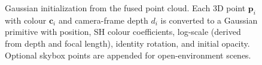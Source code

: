 \begin{figure}[t]
\caption{Gaussian initialization from the fused point cloud. Each 3D point
$\mathbf{p}_i$ with colour $\mathbf{c}_i$ and camera-frame depth $d_i$ is
converted to a Gaussian primitive with position, SH colour coefficients,
log-scale (derived from depth and focal length), identity rotation, and
initial opacity. Optional skybox points are appended for open-environment
scenes.}
\label{fig:gaussian_init}
\end{figure}
